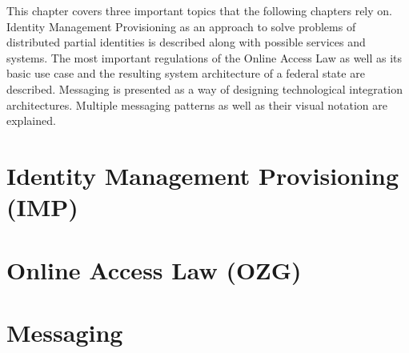 This chapter covers three important topics that the following chapters rely on. Identity Management Provisioning as an approach to solve problems of distributed partial identities is described along with possible services and systems. The most important regulations of the Online Access Law as well as its basic use case and the resulting system architecture of a federal state are described. Messaging is presented as a way of designing technological integration architectures. Multiple messaging patterns as well as their visual notation are explained.

\section{Identity Management Provisioning (IMP)} \label{imp}


\section{Online Access Law (OZG)} \label{ozg}


\section{Messaging} \label{messaging}
